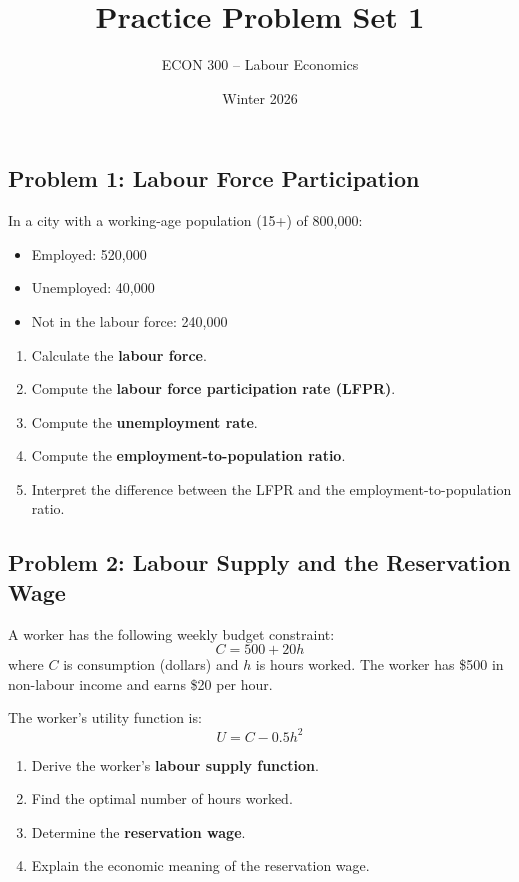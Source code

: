 \documentclass[12pt]{article}
\title{Practice Problem Set 1}
\author{ECON 300 -- Labour Economics}
\date{Winter 2026}
\begin{document}
\maketitle



\subsection*{Problem 1: Labour Force Participation}

In a city with a working-age population (15+) of 800,000:

\begin{itemize}
    \item Employed: 520,000
    \item Unemployed: 40,000
    \item Not in the labour force: 240,000
\end{itemize}

\begin{enumerate}
    \item Calculate the \textbf{labour force}.
    \item Compute the \textbf{labour force participation rate (LFPR)}.
    \item Compute the \textbf{unemployment rate}.
    \item Compute the \textbf{employment-to-population ratio}.
    \item Interpret the difference between the LFPR and the employment-to-population ratio.
\end{enumerate}

\bigskip\bigskip

\subsection*{Problem 2: Labour Supply and the Reservation Wage}

A worker has the following weekly budget constraint:
\[
C = 500 + 20h
\]
where \(C\) is consumption (dollars) and \(h\) is hours worked. The worker has \$500 in non-labour income and earns \$20 per hour.

The worker's utility function is:
\[
U = C - 0.5h^2
\]

\begin{enumerate}
    \item Derive the worker's \textbf{labour supply function}.
    \item Find the optimal number of hours worked.
    \item Determine the \textbf{reservation wage}.
    \item Explain the economic meaning of the reservation wage.
\end{enumerate}
\end{document}
